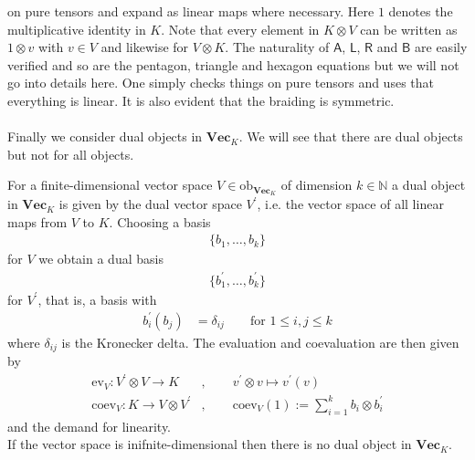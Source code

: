 on pure tensors and expand as linear maps where necessary. Here $1$ denotes the multiplicative identity in $K$. Note that every element in $K \otimes V$ can be written as $1 \otimes v$ with $v \in V$ and likewise for $V \otimes K$. The naturality of $\mathsf{A}$, $\mathsf{L}$, $\mathsf{R}$ and $\mathsf{B}$ are easily verified and so are the pentagon, triangle and hexagon equations but we will not go into details here. One simply checks things on pure tensors and uses that everything is linear. It is also evident that the braiding is symmetric.
\\\\
Finally we consider dual objects in $\mathbf{Vec}_{K}$. We will see that there are dual objects but not for all objects.
\\
\begin{lem}
\label{lem:dualvec}
For a finite-dimensional vector space $V \in \mathrm{ob}_{\mathbf{Vec}_{K}}$ of dimension $k \in \mathbb{N}$ a dual object in $\mathbf{Vec}_{K}$ is given by the dual vector space $V^{\prime}$, i.e. the vector space of all linear maps from $V$ to $K$. Choosing a basis
\begin{align*}
  \lbrace
    b_{1}
    ,
    \ldots
    ,
    b_{k}
  \rbrace
\end{align*}
for $V$ we obtain a dual basis
\begin{align*}
  \lbrace
    b_{1}^{\prime}
    ,
    \ldots
    ,
    b_{k}^{\prime}
  \rbrace
\end{align*}
for $V^{\prime}$, that is, a basis with
\begin{align*}
  b_{i}^{\prime}(b_{j})
  &=
  \delta_{ij}
  \qquad
  \text{for }
  1
  \leq
  i,j
  \leq
  k
\end{align*}
where $\delta_{ij}$ is the Kronecker delta. The evaluation and coevaluation are then given by
\begin{align*}
  \mathrm{ev}_{V}
  \colon
  V^{\prime}
  \otimes
  V
  \to
  K
  &,\qquad
  v^{\prime}
  \otimes
  v
  \mapsto
  v^{\prime}(v)
  \\
  \mathrm{coev}_{V}
  \colon
  K
  \to
  V
  \otimes
  V^{\prime}
  &,\qquad
  \mathrm{coev}_{V}(1)
  :=
  \sum_{i = 1}^{k}
  b_{i}
  \otimes
  b_{i}^{\prime}
\end{align*}
and the demand for linearity.
\\
If the vector space is inifnite-dimensional then there is no dual object in $\mathbf{Vec}_{K}$.
\end{lem}
